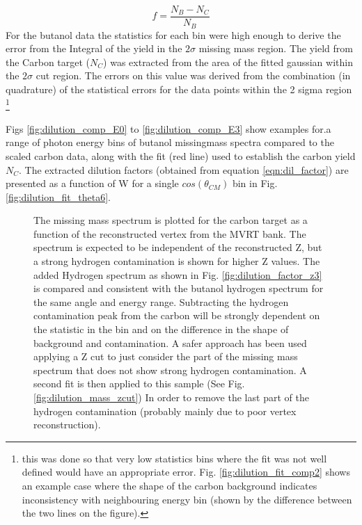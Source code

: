 \begin{equation} \label{eqn:dil_factor}
  f = \frac{N_B - N_C}{N_B}
\end{equation}
For the butanol data the statistics for each bin were high enough to derive the error from the Integral of the yield in the $2\sigma$ missing mass region.  The yield from the Carbon target ($N_C$) was extracted from the area of the fitted gaussian within the $2 \sigma$ cut region. The errors on this value was derived from the combination (in quadrature) of the statistical errors for the data points within the 2 sigma region \footnote{this was done so that very low statistics bins where the fit was not well defined would have an appropriate error. Fig. \ref{fig:dilution_fit_comp2} shows an example case where the shape of the carbon background indicates inconsistency with neighbouring energy bin (shown by the difference between the two lines on the figure). }

Figs \ref{fig:dilution_comp_E0} to \ref{fig:dilution_comp_E3} show examples for.a range of photon energy bins  of butanol missingmass spectra  compared to the scaled carbon data, along with the fit (red line) used to establish the carbon yield $N_C$. The extracted dilution factors (obtained from equation \ref{eqn:dil_factor}) are presented as a function of W for a single $cos(\theta_{CM})$ bin in Fig. \ref{fig:dilution_fit_theta6}.
 
\begin{figure}[htb]
  \begin{center}
    \qquad
    \qquad

    \caption{The missing mass spectrum is plotted for the carbon target as a function of the reconstructed vertex from the MVRT bank. The spectrum is expected to be independent of the reconstructed Z, but a strong hydrogen contamination is shown for higher Z values. The added Hydrogen spectrum as shown in Fig. \ref{fig:dilution_factor_z3} is compared and consistent with the butanol hydrogen spectrum for the same angle and energy range. Subtracting the hydrogen contamination peak from the carbon will be strongly dependent on the statistic in the bin and on the difference in the shape of background and contamination. A safer approach has been used applying a Z cut to just consider the part of the missing mass spectrum that does not show strong hydrogen contamination. A second fit is then applied to this sample (See Fig. \ref{fig:dilution_mass_zcut}) In order to remove the last part of the hydrogen contamination (probably mainly due to poor vertex reconstruction).}
    \label{fig:dilution_factor_z0}
  \end{center}
\end{figure}

